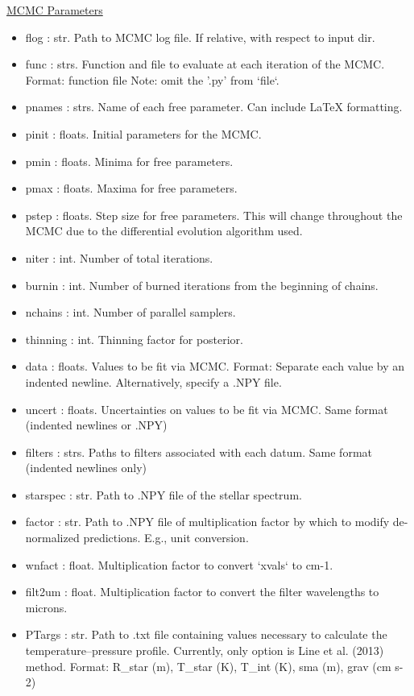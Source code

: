\documentclass[letterpaper, 12pt]{article}
\begin{document}
\noindent \underline{MCMC Parameters}
\begin{itemize}
\item flog        : str.  Path to MCMC log file. 
                          If relative, with respect to input dir.
\item func        : strs. Function and file to evaluate at each iteration of 
                          the MCMC.
                          Format: function file
                          Note: omit the '.py' from `file`.
\item pnames      : strs. Name of each free parameter. Can include LaTeX 
                          formatting.
\item pinit       : floats. Initial parameters for the MCMC.
\item pmin        : floats. Minima for free parameters.
\item pmax        : floats. Maxima for free parameters.
\item pstep       : floats. Step size for free parameters. 
                          This will change throughout the MCMC due to the 
                          differential evolution algorithm used.
\item niter       : int.  Number of total iterations.
\item burnin      : int.  Number of burned iterations from the beginning of 
                          chains.
\item nchains     : int.  Number of parallel samplers.
\item thinning    : int.  Thinning factor for posterior.
\item data        : floats. Values to be fit via MCMC. 
                    Format: Separate each value by an indented newline.
                    Alternatively, specify a .NPY file.
\item uncert      : floats. Uncertainties on values to be fit via MCMC. 
                          Same format (indented newlines or .NPY)
\item filters     : strs. Paths to filters associated with each datum. 
                          Same format (indented newlines only)
\item starspec    : str.  Path to .NPY file of the stellar spectrum.
\item factor      : str.  Path to .NPY file of multiplication factor by which 
                          to modify de-normalized predictions. 
                          E.g., unit conversion.
\item wnfact      : float. Multiplication factor to convert `xvals` to cm-1.
\item filt2um     : float. Multiplication factor to convert the filter 
                          wavelengths to microns.
\item PTargs      : str.  Path to .txt file containing values necessary to 
                          calculate the temperature--pressure profile.
                          Currently, only option is Line et al. (2013) method.
                          Format: R\_star (m), T\_star (K), T\_int (K), 
                                  sma (m), grav (cm s-2)

\end{itemize}
\end{document}
